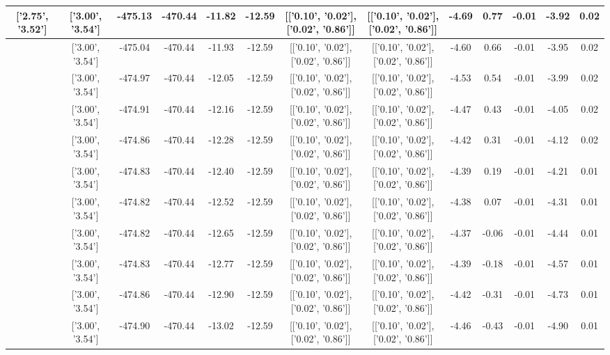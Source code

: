 \begin{table}[htbp]
\begin{adjustbox}{angle=90}
\begin{tabular}{|c|c|c|c|c|c|c|c|c|c|c|c|c|}
 ['2.75', '3.52'] & ['3.00', '3.54'] & -475.13 & -470.44 & -11.82 & -12.59 & [['0.10', '0.02'], ['0.02', '0.86']] & [['0.10', '0.02'], ['0.02', '0.86']] & -4.69 & 0.77 & -0.01 & -3.92 & 0.02\\ \hline
 ['2.79', '3.53'] & ['3.00', '3.54'] & -475.04 & -470.44 & -11.93 & -12.59 & [['0.10', '0.02'], ['0.02', '0.86']] & [['0.10', '0.02'], ['0.02', '0.86']] & -4.60 & 0.66 & -0.01 & -3.95 & 0.02\\ \hline
 ['2.82', '3.53'] & ['3.00', '3.54'] & -474.97 & -470.44 & -12.05 & -12.59 & [['0.10', '0.02'], ['0.02', '0.86']] & [['0.10', '0.02'], ['0.02', '0.86']] & -4.53 & 0.54 & -0.01 & -3.99 & 0.02\\ \hline
 ['2.86', '3.53'] & ['3.00', '3.54'] & -474.91 & -470.44 & -12.16 & -12.59 & [['0.10', '0.02'], ['0.02', '0.86']] & [['0.10', '0.02'], ['0.02', '0.86']] & -4.47 & 0.43 & -0.01 & -4.05 & 0.02\\ \hline
 ['2.90', '3.53'] & ['3.00', '3.54'] & -474.86 & -470.44 & -12.28 & -12.59 & [['0.10', '0.02'], ['0.02', '0.86']] & [['0.10', '0.02'], ['0.02', '0.86']] & -4.42 & 0.31 & -0.01 & -4.12 & 0.02\\ \hline
 ['2.94', '3.54'] & ['3.00', '3.54'] & -474.83 & -470.44 & -12.40 & -12.59 & [['0.10', '0.02'], ['0.02', '0.86']] & [['0.10', '0.02'], ['0.02', '0.86']] & -4.39 & 0.19 & -0.01 & -4.21 & 0.01\\ \hline
 ['2.98', '3.54'] & ['3.00', '3.54'] & -474.82 & -470.44 & -12.52 & -12.59 & [['0.10', '0.02'], ['0.02', '0.86']] & [['0.10', '0.02'], ['0.02', '0.86']] & -4.38 & 0.07 & -0.01 & -4.31 & 0.01\\ \hline
 ['3.01', '3.54'] & ['3.00', '3.54'] & -474.82 & -470.44 & -12.65 & -12.59 & [['0.10', '0.02'], ['0.02', '0.86']] & [['0.10', '0.02'], ['0.02', '0.86']] & -4.37 & -0.06 & -0.01 & -4.44 & 0.01\\ \hline
 ['3.05', '3.54'] & ['3.00', '3.54'] & -474.83 & -470.44 & -12.77 & -12.59 & [['0.10', '0.02'], ['0.02', '0.86']] & [['0.10', '0.02'], ['0.02', '0.86']] & -4.39 & -0.18 & -0.01 & -4.57 & 0.01\\ \hline
 ['3.09', '3.55'] & ['3.00', '3.54'] & -474.86 & -470.44 & -12.90 & -12.59 & [['0.10', '0.02'], ['0.02', '0.86']] & [['0.10', '0.02'], ['0.02', '0.86']] & -4.42 & -0.31 & -0.01 & -4.73 & 0.01\\ \hline
 ['3.13', '3.55'] & ['3.00', '3.54'] & -474.90 & -470.44 & -13.02 & -12.59 & [['0.10', '0.02'], ['0.02', '0.86']] & [['0.10', '0.02'], ['0.02', '0.86']] & -4.46 & -0.43 & -0.01 & -4.90 & 0.01\\ \hline

\end{tabular}
\end{adjustbox}
\end{table}
